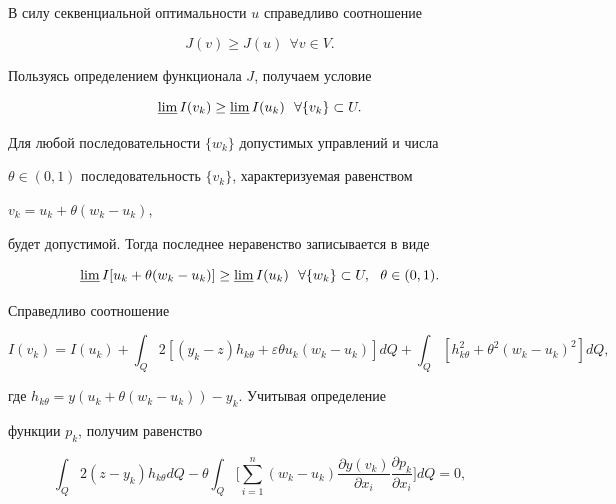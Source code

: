 \begin{pf} 


В силу секвенциальной оптимальности $u$ справедливо соотношение 


$$ 


J(v)\ge J(u)\ \ \forall v\in V. 


$$ 


Пользуясь определением функционала $J$, получаем условие 


$$ 


\varliminf I(v_k)\ge\varliminf I(u_k) 


\ \ \forall\{v_k\}\subset U. 


$$ 


Для любой последовательности $\{w_k\}$ допустимых управлений и числа 


$\theta\in(0,1)$ последовательность $\{v_k\}$, характеризуемая равенством 


$v_k=u_k+\theta(w_k-u_k)$, 


будет допустимой. Тогда последнее неравенство записывается в виде 


\begin{equation} 


\varliminf I[u_k+\theta(w_k-u_k)]\ge 


\varliminf I(u_k)\ \ \forall \{w_k\}\subset U, 


\ \ \theta\in(0,1). 


\end{equation} 


Справедливо соотношение 


\begin{equation} 


I(v_k)=I(u_k)+\int_Q2[(y_k-z)h_{k\theta}+ 


\varepsilon\theta u_k(w_k-u_k)]d Q+\int_Q 


[h^2_{k\theta}+\theta^2(w_k-u_k)^2]d Q, 


\end{equation} 


где $h_{k\theta}=y(u_k+\theta(w_k-u_k))-y_k$. Учитывая определение 


функции $p_k$, получим равенство 


$$ 


\int_Q 2(z-y_k)h_{k\theta}d Q-\theta\int_Q\bigg[\sum^n_{i=1} 


(w_k-u_k)\frac{\partial y(v_k)}{\partial x_i} 


\frac{\partial p_k}{\partial x_i}\bigg]d Q=0, 


$$ 



\end{pf}
